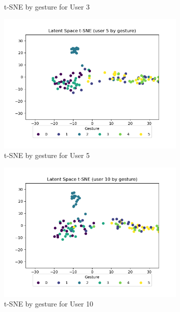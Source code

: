 \begin{figure}[b]
\begin{subfigure}{0.3\textwidth}
		\caption{t-SNE by gesture for User 3}
	\end{subfigure}
	\hfill
	\begin{subfigure}{0.3\textwidth}
		\centering
		\includegraphics[width=\textwidth]{figures/short/short_ls_u5}
		\caption{t-SNE by gesture for User 5}
	\end{subfigure}
	\hfill
	\begin{subfigure}{0.3\textwidth}
		\centering
		\includegraphics[width=\textwidth]{figures/short/short_ls_u10}
		\caption{t-SNE by gesture for User 10}
	\end{subfigure}
	\hfill
	\begin{subfigure}{0.3\textwidth}
		\centering

\end{subfigure}
\end{figure}
